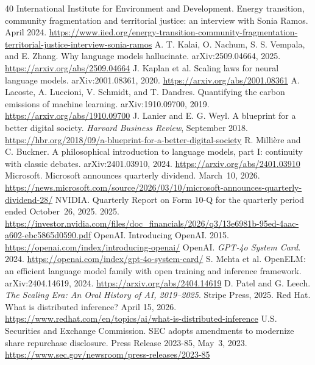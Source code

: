 \documentclass[10pt,a4paper,twocolumn]{article}
\begin{document}
{\begin{thebibliography}{40}
 International Institute for Environment and Development. Energy transition, community fragmentation and territorial justice: an interview with Sonia Ramos. April 2024. \url{https://www.iied.org/energy-transition-community-fragmentation-territorial-justice-interview-sonia-ramos}
 A. T. Kalai, O. Nachum, S. S. Vempala, and E. Zhang. Why language models hallucinate. arXiv:2509.04664, 2025. \url{https://arxiv.org/abs/2509.04664}
 J. Kaplan et al. Scaling laws for neural language models. arXiv:2001.08361, 2020. \url{https://arxiv.org/abs/2001.08361}
 A. Lacoste, A. Luccioni, V. Schmidt, and T. Dandres. Quantifying the carbon emissions of machine learning. arXiv:1910.09700, 2019. \url{https://arxiv.org/abs/1910.09700}
 J. Lanier and E. G. Weyl. A blueprint for a better digital society. \emph{Harvard Business Review}, September 2018. \url{https://hbr.org/2018/09/a-blueprint-for-a-better-digital-society}
 R. Milli\`ere and C. Buckner. A philosophical introduction to language models, part I: continuity with classic debates. arXiv:2401.03910, 2024. \url{https://arxiv.org/abs/2401.03910}
 Microsoft. Microsoft announces quarterly dividend. March~10, 2026. \url{https://news.microsoft.com/source/2026/03/10/microsoft-announces-quarterly-dividend-28/}
 NVIDIA. Quarterly Report on Form 10-Q for the quarterly period ended October~26, 2025. 2025. \url{https://investor.nvidia.com/files/doc_financials/2026/q3/13e6981b-95ed-4aac-a602-ebc5865d0590.pdf}
 OpenAI. Introducing OpenAI. 2015. \url{https://openai.com/index/introducing-openai/}
 OpenAI. \emph{GPT-4o System Card}. 2024. \url{https://openai.com/index/gpt-4o-system-card/}
 S. Mehta et al. OpenELM: an efficient language model family with open training and inference framework. arXiv:2404.14619, 2024. \url{https://arxiv.org/abs/2404.14619}
 D. Patel and G. Leech. \emph{The Scaling Era: An Oral History of AI, 2019--2025}. Stripe Press, 2025.
 Red Hat. What is distributed inference? April 15, 2026. \url{https://www.redhat.com/en/topics/ai/what-is-distributed-inference}
 U.S. Securities and Exchange Commission. SEC adopts amendments to modernize share repurchase disclosure. Press Release 2023-85, May~3, 2023. \url{https://www.sec.gov/newsroom/press-releases/2023-85}

\end{thebibliography}}
\end{document}
